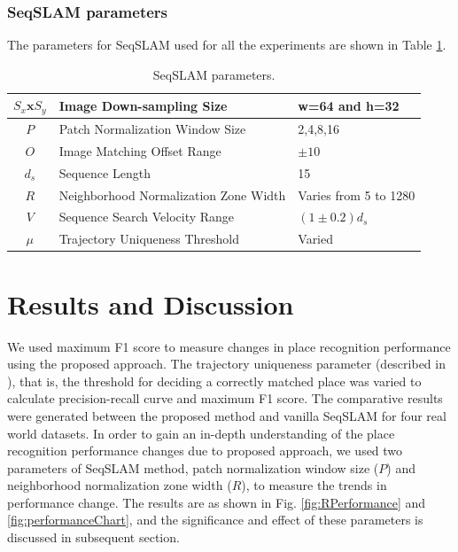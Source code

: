 \documentclass[letterpaper, 10 pt, conference]{ieeeconf}  %
\begin{document}
\subsubsection{SeqSLAM parameters}
The parameters for SeqSLAM used for all the experiments are shown in Table \ref{table:seqSLAMParams}.

\begin{table}[!h]
	\caption{SeqSLAM parameters.}
	\begin{tabular}{|c|p{4cm}|p{2.5cm}|}
		\hline
		$S_x\mathbf{x}S_y$ & Image Down-sampling Size & w=64 and h=32 \\
		\hline
		$P$ & Patch Normalization Window Size & {2,4,8,16} \\
		\hline
		$O$ & Image Matching Offset Range & $\pm10$ \\
		\hline
		$d_s$ & Sequence Length & 15 \\
		\hline
		$R$ & Neighborhood Normalization Zone Width & Varies from 5 to 1280 \\
		\hline
		$V$ & Sequence Search Velocity Range & $(1\pm0.2)d_s$ \\
		\hline
		$\mu$ & Trajectory Uniqueness Threshold & Varied \\
		\hline
	\end{tabular}
	\label{table:seqSLAMParams}
\end{table}

\section{Results and Discussion}
We used maximum F1 score to measure changes in place recognition performance using the proposed approach. The trajectory uniqueness parameter (described in \cite{Milford2012}), that is, the threshold for deciding a correctly matched place was varied to calculate precision-recall curve and maximum F1 score. The comparative results were generated between the proposed method and vanilla SeqSLAM for four real world datasets. In order to gain an in-depth understanding of the place recognition performance changes due to proposed approach, we used two parameters of SeqSLAM method, patch normalization window size ($P$) and neighborhood normalization zone width ($R$), to measure the trends in performance change. The results are as shown in Fig. \ref{fig:RPerformance} and \ref{fig:performanceChart}, and the significance and effect of these parameters is discussed in subsequent section. 
\end{document}
